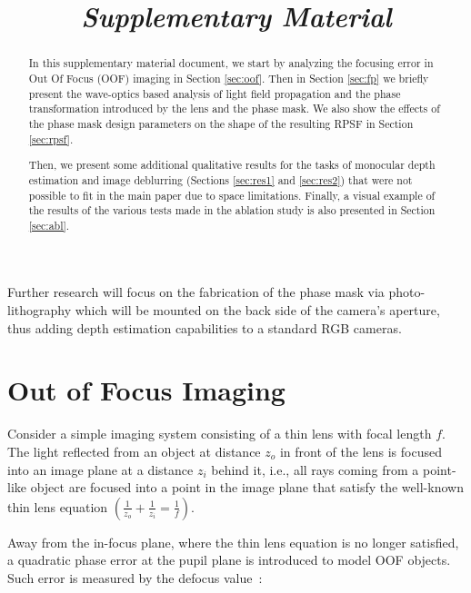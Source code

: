 \documentclass[preprint,5p,twocolumn]{elsarticle}
\begin{document}
Further research will focus on the fabrication of the phase mask via photo-lithography which will be mounted on the back side of the camera's aperture, thus adding depth estimation capabilities to a standard RGB cameras. 



\begin{frontmatter}

\title{\\ \textit{Supplementary Material}}


\begin{abstract}
In this supplementary material document, we start by analyzing the focusing error in Out Of Focus (OOF) imaging in Section \ref{sec:oof}.  
Then in Section \ref{sec:fp} we briefly present the wave-optics based analysis of light field propagation and  the phase transformation introduced by the lens and the phase mask. 
We also show the effects of the phase mask design parameters on the shape of the resulting RPSF in Section \ref{sec:rpsf}. 

Then, we present some additional qualitative results for the tasks of monocular depth estimation and image deblurring (Sections \ref{sec:res1} and \ref{sec:res2}) that were not possible to fit in the main paper due to space limitations. Finally, a visual example of the results of the various tests made in the ablation study is also presented in Section \ref{sec:abl}.
\end{abstract}

\end{frontmatter}
\section*{}
\setcounter{section}{0}
\section{Out of Focus Imaging}

\label{sec:oof}
Consider a simple imaging system consisting of a thin lens with focal length $f$. The light reflected from an object at distance $z_{o}$ in front of the lens is focused into an image plane at a distance $z_{i}$ behind it, i.e., all rays coming from a point-like object are focused into a point in the image plane that satisfy the well-known thin lens equation $(\frac{1}{z_{o}}+\frac{1}{z_{i}} = \frac{1}{f})$.

Away from the in-focus plane, where the thin lens equation is no longer satisfied, a quadratic phase error at the pupil plane is introduced to model OOF objects. Such error is measured by the defocus value~\cite{goodman2005introduction}:
\end{document}
